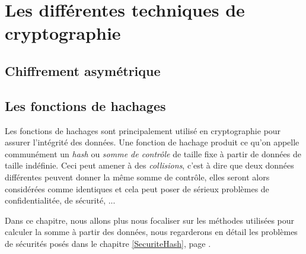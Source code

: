 \chapter{Les différentes techniques de cryptographie}







\section{Chiffrement asymétrique}

\section{Les fonctions de hachages}
Les fonctions de hachages sont principalement utilisé en cryptographie
pour assurer l'intégrité des données. Une fonction de hachage produit
ce qu'on appelle communément un \emph{hash} ou \emph{somme de
  contrôle}  de taille fixe à partir de
données de taille indéfinie. Ceci peut amener à des \emph{collisions},
c'est à dire que deux données différentes peuvent donner la même somme
de contrôle, elles seront alors considérées comme identiques et cela
peut poser de sérieux problèmes de confidentialitée, de sécurité, ...

Dans ce chapitre, nous allons plus nous focaliser sur les méthodes
utilisées pour calculer la somme à partir des données, nous
regarderons en détail les problèmes de sécurités posés dans le
chapitre \ref{SecuriteHash}, page \pageref{SecuriteHash}.


